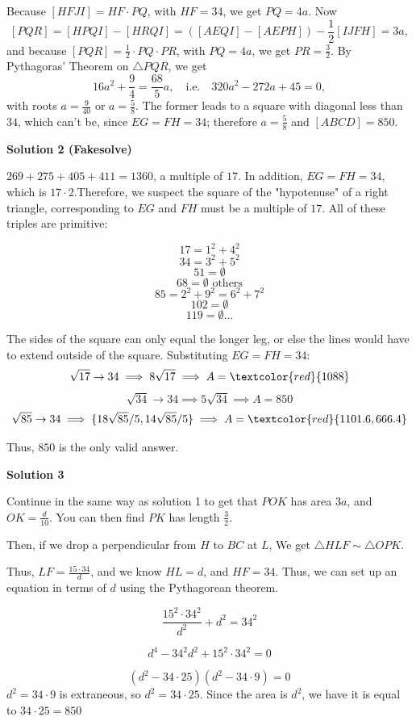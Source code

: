 \begin{enumerate}
 Because $[HFJI]= HF\cdot PQ$, with $HF=34$, we get $PQ=4a$. Now 
 \[[PQR]=[HPQI]-[HRQI]= ([AEQI]-[AEPH])-\frac 12[IJFH] = 3a,\] and because $[PQR]=\frac 12 \cdot PQ\cdot PR$, with $PQ=4a$, we get $PR=\frac 32$. By Pythagoras' Theorem on $\triangle PQR$, we get 
 \[16a^2+\frac 94 =\frac{68}{5}a,\quad \text{i.e.}\quad 320a^2-272a+45=0,\] with roots $a=\frac 9{40}$ or $a=\frac58$. The former leads to a square with diagonal less than $34$, which can't be, since $EG=FH=34$; therefore $a=\frac 58$ and $[ABCD]=850$.

 



\textbf{Solution 2 (Fakesolve)}

$269+275+405+411=1360$, a multiple of $17$. In addition, $EG=FH=34$, which is $17\cdot 2$.Therefore, we suspect the square of the "hypotenuse" of a right triangle, corresponding to $EG$ and $FH$  must be a multiple of $17$. All of these triples are primitive:

 
 \[17=1^2+4^2\]
 \[34=3^2+5^2\]
 \[51=\emptyset\]
 \[68=\emptyset\text{ others}\]
 \[85=2^2+9^2=6^2+7^2\]
 \[102=\emptyset\]
 \[119=\emptyset \dots\]

 The sides of the square can only equal the longer leg, or else the lines would have to extend outside of the square. Substituting $EG=FH=34$:
 \[\sqrt{17}\rightarrow 34\implies 8\sqrt{17}\implies A=\textcolor{red}{1088}\]
 \[\sqrt{34}\rightarrow 34\implies 5\sqrt{34}\implies A=850\]
 \[\sqrt{85}\rightarrow 34\implies \{18\sqrt{85}/5,14\sqrt{85}/5\}\implies A=\textcolor{red}{1101.6,666.4}\]

 Thus, $\boxed{850}$ is the only valid answer.

 



\textbf{Solution 3}

Continue in the same way as solution 1 to get that $POK$ has area $3a$, and $OK = \frac{d}{10}$. You can then find $PK$ has length $\frac 32$.

 Then, if we drop a perpendicular from $H$ to $BC$ at $L$, We get $\triangle HLF \sim \triangle OPK$.

 Thus, $LF = \frac{15\cdot 34}{d}$, and we know $HL = d$, and $HF = 34$. Thus, we can set up an equation in terms of $d$ using the Pythagorean theorem.

 
 \[\frac{15^2 \cdot 34^2}{d^2} + d^2 = 34^2\]

 \[d^4 - 34^2 d^2 + 15^2 \cdot 34^2 = 0\]

 \[(d^2 - 34 \cdot 25)(d^2 - 34 \cdot 9) = 0\]
$d^2 = 34 \cdot 9$ is extraneous, so $d^2 = 34 \cdot 25$. Since the area is $d^2$, we have it is equal to $34 \cdot 25 = \boxed{850}$


\end{enumerate}
